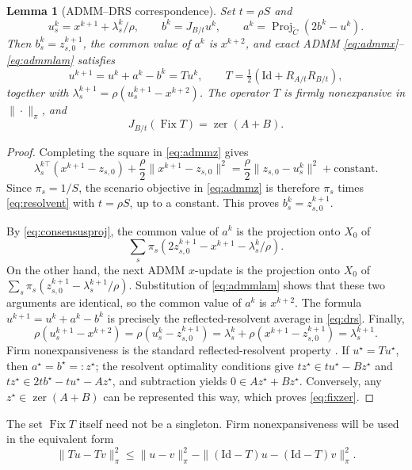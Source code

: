 \documentclass[preprint,12pt,3p]{elsarticle}
\newtheorem{lemma}[theorem]{Lemma}
\theoremstyle{definition}
\begin{document}
\begin{lemma}[ADMM--DRS correspondence]\label{lem:admm-drs}
Set $t=\rho S$ and
\[
u_s^k=x^{k+1}+\lambda_s^k/\rho,\qquad b^k=J_{B/t}u^k,\qquad a^k=\operatorname{Proj}_{\widetilde C}(2b^k-u^k).
\]
Then $b_s^k=z_{s,0}^{k+1}$, the common value of $a^k$ is $x^{k+2}$, and exact ADMM \eqref{eq:admmx}--\eqref{eq:admmlam} satisfies
\begin{equation}
u^{k+1}=u^k+a^k-b^k=Tu^k,\qquad T=\tfrac12(\mathrm{Id}+R_{A/t}R_{B/t}),
\label{eq:drs}
\end{equation}
together with $\lambda_s^{k+1}=\rho(u_s^{k+1}-x^{k+2})$. The operator $T$ is firmly nonexpansive in $\|\cdot\|_\pi$, and
\begin{equation}
J_{B/t}(\operatorname{Fix}T)=\operatorname{zer}(A+B).
\label{eq:fixzer}
\end{equation}
\end{lemma}
\begin{proof}
Completing the square in \eqref{eq:admmz} gives
\[
\lambda_s^{k\top}(x^{k+1}-z_{s,0})+\frac{\rho}{2}\|x^{k+1}-z_{s,0}\|^2
=\frac{\rho}{2}\|z_{s,0}-u_s^k\|^2+\text{constant}.
\]
Since $\pi_s=1/S$, the scenario objective in \eqref{eq:admmz} is therefore $\pi_s$ times \eqref{eq:resolvent} with $t=\rho S$, up to a constant. This proves $b_s^k=z_{s,0}^{k+1}$.

By \eqref{eq:consensusproj}, the common value of $a^k$ is the projection onto $X_0$ of
\[
\sum_s\pi_s(2z_{s,0}^{k+1}-x^{k+1}-\lambda_s^k/\rho).
\]
On the other hand, the next ADMM $x$-update is the projection onto $X_0$ of $\sum_s\pi_s(z_{s,0}^{k+1}-\lambda_s^{k+1}/\rho)$. Substitution of \eqref{eq:admmlam} shows that these two arguments are identical, so the common value of $a^k$ is $x^{k+2}$. The formula $u^{k+1}=u^k+a^k-b^k$ is precisely the reflected-resolvent average in \eqref{eq:drs}. Finally,
\[
\rho(u_s^{k+1}-x^{k+2})=\rho(u_s^k-z_{s,0}^{k+1})
=\lambda_s^k+\rho(x^{k+1}-z_{s,0}^{k+1})=\lambda_s^{k+1}.
\]
Firm nonexpansiveness is the standard reflected-resolvent property \cite{eckstein1992douglas,eckstein2015understanding}. If $u^\star=Tu^\star$, then $a^\star=b^\star=:z^\star$; the resolvent optimality conditions give $tz^\star\in tu^\star-Bz^\star$ and $tz^\star\in2tb^\star-tu^\star-Az^\star$, and subtraction yields $0\in Az^\star+Bz^\star$. Conversely, any $z^\star\in\operatorname{zer}(A+B)$ can be represented this way, which proves \eqref{eq:fixzer}.
\end{proof}
The set $\operatorname{Fix}T$ itself need not be a singleton. Firm nonexpansiveness will be used in the equivalent form
\begin{equation}
\|Tu-Tv\|_\pi^2\leq\|u-v\|_\pi^2-\|(\mathrm{Id}-T)u-(\mathrm{Id}-T)v\|_\pi^2.
\label{eq:fne}
\end{equation}
\end{document}
